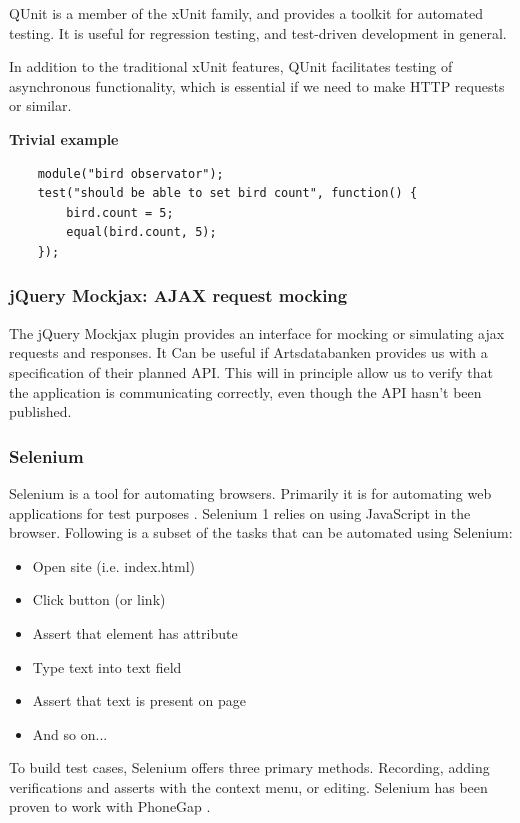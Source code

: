 	QUnit is a member of the xUnit family, and provides a toolkit for automated
	testing. It is useful for regression testing, and test-driven development in
	general.

	In addition to the traditional xUnit features, QUnit facilitates testing of
	asynchronous functionality, which is essential if we need to make HTTP
	requests or similar.

	\textbf{Trivial example}

\begin{lstlisting}
	module("bird observator");
	test("should be able to set bird count", function() {
		bird.count = 5;
		equal(bird.count, 5);
	});
\end{lstlisting}

\subsubsection{jQuery Mockjax: AJAX request mocking}

	The jQuery Mockjax plugin provides an interface for mocking or simulating
	ajax requests and responses\cite{github:jquery-mockjax}. It Can be useful if Artsdatabanken provides us
	with a specification of their planned API. This will in principle allow us
	to verify that the application is communicating correctly, even though the
	API hasn't been published.

\subsubsection{Selenium}

	Selenium is a tool for automating browsers. Primarily it is for automating
	web applications for test purposes \cite{seleniumhq:home}. Selenium 1 relies
	on using JavaScript in the browser. Following is a subset of the tasks that
	can be automated using Selenium:

	\begin{itemize}
		\item Open site (i.e. index.html)
		\item Click button (or link)
		\item Assert that element has attribute
		\item Type text into text field
		\item Assert that text is present on page
		\item And so on...
	\end{itemize}

	To build test cases, Selenium offers three primary methods. Recording, adding
	verifications and asserts with the context menu, or editing. Selenium has
	been proven to work with PhoneGap \cite{phonegap:automatic-test-cases}.


